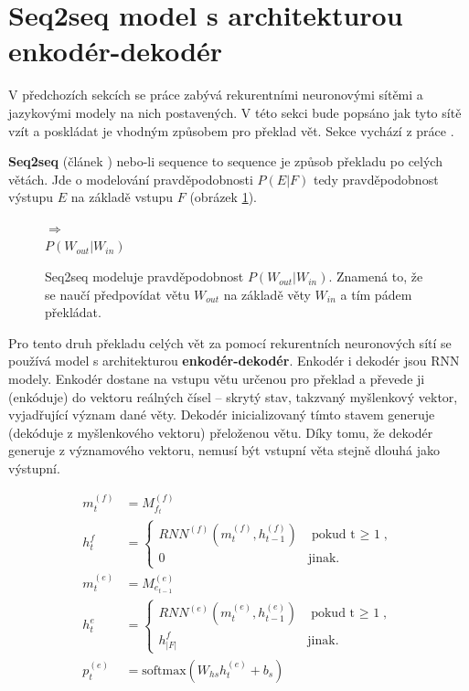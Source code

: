 \section{Seq2seq model s architekturou enkodér-dekodér} \label{section:encoderdecoder}
V předchozích sekcích se práce zabývá rekurentními neuronovými sítěmi a jazykovými modely na nich postavených. V této sekci bude popsáno jak tyto sítě vzít a poskládat je vhodným způsobem pro překlad vět. Sekce vychází z práce \cite{nmtTutorial}.

\textbf{Seq2seq} (článek \cite{seq2seq}) nebo-li sequence to sequence je způsob překladu po celých větách. Jde o modelování pravděpodobnosti $P(E|F)$ tedy pravděpodobnost výstupu $E$ na základě vstupu $F$ (obrázek \ref{figure:seqProbability}).

\begin{figure}[H]
    \begin{center}
        \setlength{\fboxsep}{8pt}
        $\Longrightarrow$
        \\ \vspace{5mm}
        $P(W_{out}|W_{in})$
    \end{center}
	\caption{Seq2seq modeluje pravděpodobnost $P(W_{out}|W_{in})$. Znamená to, že se naučí předpovídat větu $W_{out}$ na základě věty $W_{in}$ a tím pádem překládat.}
	\label{figure:seqProbability}
\end{figure}

Pro tento druh překladu celých vět za pomocí rekurentních neuronových sítí se používá model s architekturou \textbf{enkodér-dekodér}. Enkodér i dekodér jsou RNN modely. Enkodér dostane na vstupu větu určenou pro překlad a převede ji (enkóduje) do vektoru reálných čísel -- skrytý stav, takzvaný myšlenkový vektor, vyjadřující význam dané věty. Dekodér inicializovaný tímto stavem generuje (dekóduje z myšlenkového vektoru) přeloženou větu. Díky tomu, že dekodér generuje z významového vektoru, nemusí být vstupní věta stejně dlouhá jako výstupní.


\begin{align}
    m^{(f)}_{t}&=M^{(f)}_{f_t}\label{figure:encoderEmb} \\
    h^{f}_{t}&=\begin{cases}
                    RNN^{(f)}(m^{(f)}_{t},h^{(f)}_{t-1}) & \mbox{pokud t $\geq$ 1},\label{figure:encoderState} \\
                    0 & \mbox{jinak}.
                \end{cases}\\
    m^{(e)}_{t}&=M^{(e)}_{e_{t-1}}\label{figure:decoderEmb} \\
    h^{e}_{t}&=\begin{cases}
                    RNN^{(e)}(m^{(e)}_{t},h^{(e)}_{t-1}) & \mbox{pokud t $\geq$ 1},\\
                    h^{f}_{|F|} & \mbox{jinak}.
                \end{cases}\label{figure:decoderState} \\
    p^{(e)}_{t}&=\mbox{softmax}(W_{hs}h^{(e)}_{t} + b_{s}) \label{figure:resultSoftmax}
\end{align}


